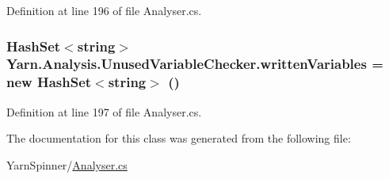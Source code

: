 Definition at line 196 of file Analyser.\-cs.

\hypertarget{a00179_a0c2fe6eded1b10b135ca2469f5980a39}{
\subsubsection[{written\-Variables}]{\setlength{\rightskip}{0pt plus 5cm}Hash\-Set$<$string$>$ Yarn.\-Analysis.\-Unused\-Variable\-Checker.\-written\-Variables = new Hash\-Set$<$string$>$ ()\hspace{0.3cm}{\ttfamily [private]}}}\label{a00179_a0c2fe6eded1b10b135ca2469f5980a39}


Definition at line 197 of file Analyser.\-cs.



The documentation for this class was generated from the following file\-:\begin{DoxyCompactItemize}
\item 
Yarn\-Spinner/\hyperlink{a00293}{Analyser.\-cs}\end{DoxyCompactItemize}
